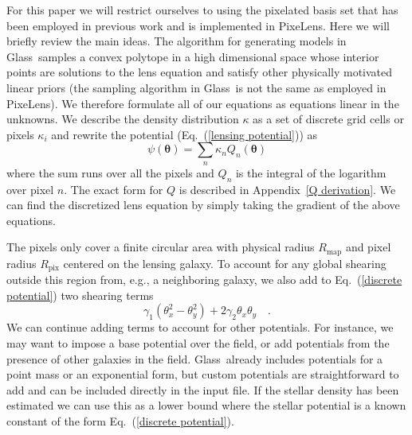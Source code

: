 \documentclass[galley,usenatbib]{mn2e}
\newcommand{\Glass}{{\sc Glass}}
\newcommand{\PixeLens}{{\sc PixeLens}}
\newcommand{\Rmap}{\ensuremath{R_\mathrm{map}}}
\newcommand{\Rpix}{\ensuremath{R_\mathrm{pix}}}
\newcommand{\eqnref}[1] {Eq.~(\ref{#1})}
\newcommand{\appref}[1] {Appendix~\ref{#1}}
\renewcommand{\vec}[1]{\ensuremath{\boldsymbol{#1}}}
\begin{document}
For this paper we will restrict ourselves to using the pixelated basis set that
has been employed in previous work and is implemented in \PixeLens. Here we
will briefly review the main ideas. The algorithm for generating models in
\Glass\ samples a convex polytope in a high dimensional space whose interior
points are solutions to the lens equation and satisfy other physically
motivated linear priors (the sampling algorithm in \Glass\ is not the same as
employed in \PixeLens).  We therefore formulate all of our equations as
equations linear in the unknowns. We describe the density distribution $\kappa$
as a set of discrete grid cells or pixels $\kappa_i$ and rewrite the potential
(\eqnref{lensing potential}) as
%
\begin{equation}
  \psi(\vec\theta) = \sum_n \kappa_n Q_n(\vec\theta)
  \label{discrete potential}
\end{equation}
%
where the sum runs over all the pixels and $Q_n$ is the integral of the logarithm
over pixel $n$. The exact form for $Q$ is described in \appref{Q derivation}.
We can find the discretized lens equation by simply taking the gradient of the
above equations. 

The pixels only cover a finite circular area with physical radius $\Rmap$ and
pixel radius $\Rpix$ centered on the lensing galaxy. To account for any global
shearing outside this region from, e.g., a neighboring galaxy, we also add to
\eqnref{discrete potential} two shearing terms
%
\begin{equation}
\label{shear}
\gamma_1(\theta_x^2 - \theta_y^2) + 2\gamma_2\theta_x\theta_y\quad.
\end{equation}
%
We can continue adding terms to account for other potentials. For instance,
we may want to impose a base potential over the field, or add potentials
from the presence of other galaxies in the field. \Glass\
already includes potentials for a point mass or an exponential form, but custom
potentials are straightforward to add and can be included directly in the input file.
If the stellar density has been estimated we can use this as a lower bound
where the stellar potential is a known constant of the form \eqnref{discrete
potential}.

%
%
\end{document}
